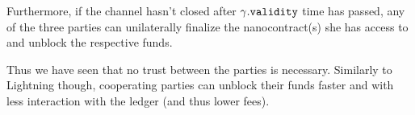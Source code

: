     Furthermore, if the channel hasn't closed after $\gamma\mbox{.\texttt{validity}}$ time
    has passed, any of the three parties can unilaterally finalize the nanocontract(s) she
    has access to and unblock the respective funds.

    Thus we have seen that no trust between the parties is necessary. Similarly to
    Lightning though, cooperating parties can unblock their funds faster and with less
    interaction with the ledger (and thus lower fees).

